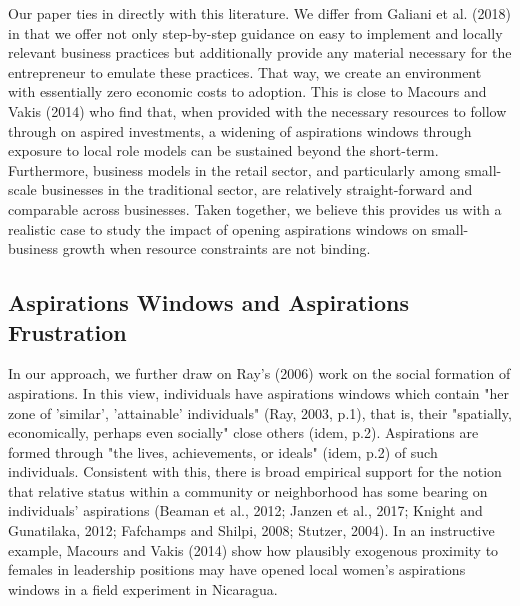 \documentclass[11.5pt]{article}
\begin{document}
{Our paper ties in directly with this literature. We differ from Galiani et al. (2018) in that we offer not only step-by-step guidance on easy to implement and locally relevant business practices but additionally provide any material necessary for the entrepreneur to emulate these practices. That way, we create an environment with essentially zero economic costs to adoption. This is close to Macours and Vakis (2014) who find that, when provided with the necessary resources to follow through on aspired investments, a widening of aspirations windows through exposure to local role models can be sustained beyond the short-term. Furthermore, business models in the retail sector, and particularly among small-scale businesses in the traditional sector, are relatively straight-forward and comparable across businesses. Taken together, we believe this provides us with a realistic case to study the impact of opening aspirations windows on small-business growth when resource constraints are not binding.

\subsection{Aspirations Windows and Aspirations Frustration}

In our approach, we further draw on Ray's (2006) work on the social formation of aspirations. In this view, individuals have aspirations windows which contain "her zone of 'similar', 'attainable' individuals" (Ray, 2003, p.1), that is, their "spatially, economically, perhaps even socially" close others (idem, p.2). Aspirations are formed through "the lives, achievements, or ideals" (idem, p.2) of such individuals. Consistent with this, there is broad empirical support for the notion that relative status within a community or neighborhood has some bearing on individuals' aspirations (Beaman et al., 2012; Janzen et al., 2017; Knight and Gunatilaka, 2012; Fafchamps and Shilpi, 2008; Stutzer, 2004). In an instructive example, Macours and Vakis (2014) show how plausibly exogenous proximity to females in leadership positions may have opened local women's aspirations windows in a field experiment in Nicaragua. 

}
\end{document}
